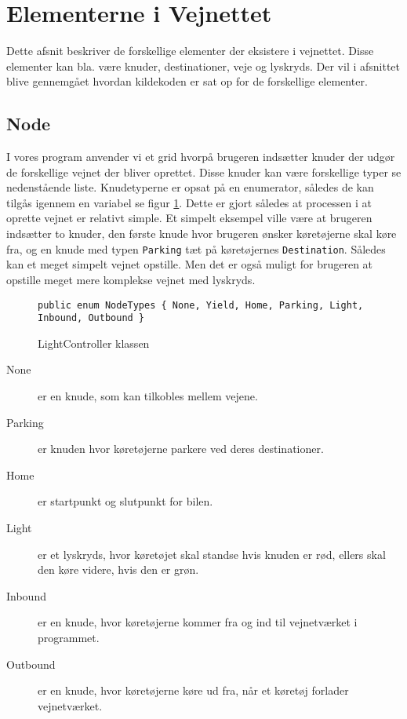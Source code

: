 \section{Elementerne i Vejnettet}\label{ElementerVejnettet}
Dette afsnit beskriver de forskellige elementer der eksistere i vejnettet. Disse elementer kan bla. være knuder, destinationer, veje og lyskryds. Der vil i afsnittet blive gennemgået hvordan kildekoden er sat op for de forskellige elementer. 

\subsection*{Node}
I vores program anvender vi et grid hvorpå brugeren indsætter knuder der udgør de forskellige vejnet der bliver oprettet. Disse knuder kan være forskellige typer se nedenstående liste. Knudetyperne er opsat på en enumerator, således de kan tilgås igennem en variabel se figur \ref{enumNodeTypes}. Dette er gjort således at processen i at oprette vejnet er relativt simple. Et simpelt eksempel ville være at brugeren indsætter to knuder, den første knude hvor brugeren ønsker køretøjerne skal køre fra, og en knude med typen \texttt{Parking} tæt på køretøjernes \texttt{Destination}. Således kan et meget simpelt vejnet opstille. Men det er også muligt for brugeren at opstille meget mere komplekse vejnet med lyskryds.

\begin{figure}[H]
\begin{lstlisting}
public enum NodeTypes { None, Yield, Home, Parking, Light, Inbound, Outbound }
\end{lstlisting}
\caption{LightController klassen}\label{enumNodeTypes}
\end{figure}

\begin{description}
\item [None] er en knude, som kan tilkobles mellem vejene.
\item [Parking] er knuden hvor køretøjerne parkere ved deres destinationer.
\item [Home] er startpunkt og slutpunkt for bilen.
\item [Light] er et lyskryds, hvor køretøjet skal standse hvis knuden er rød, ellers skal den køre videre, hvis den er grøn.
\item [Inbound] er en knude, hvor køretøjerne kommer fra og ind til vejnetværket i programmet.
\item [Outbound] er en knude, hvor køretøjerne køre ud fra, når et køretøj forlader vejnetværket.
\end{description}

